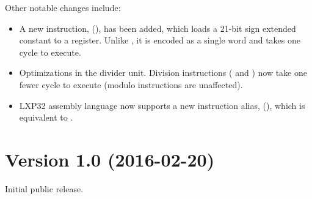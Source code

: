 \documentclass[a4paper,12pt,twoside,extrafontsizes]{memoir}
\begin{document}
Other notable changes include:

\begin{itemize}
	\item A new instruction,  (), has been added, which loads a 21-bit sign extended constant to a register. Unlike , it is encoded as a single word and takes one cycle to execute.
	\item Optimizations in the divider unit. Division instructions ( and ) now take one fewer cycle to execute (modulo instructions are unaffected).
	\item LXP32 assembly language now supports a new instruction alias,  (), which is equivalent to .
\end{itemize}

\section*{Version 1.0 (2016-02-20)}

Initial public release.
\end{document}
